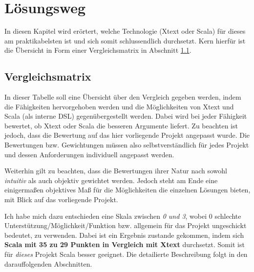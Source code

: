 \chapter{Lösungsweg}

In diesen Kapitel wird erörtert, welche Technologie (Xtext oder Scala) für
dieses am praktikabelsten ist und sich somit schlussendlich durchsetzt.
Kern hierfür ist die Übersicht in Form einer Vergleichsmatrix in Abschnitt
\ref{sec-vergleichsmatrix}.

\section{Vergleichsmatrix}\label{sec-vergleichsmatrix}

In dieser Tabelle soll eine Übersicht über den Vergleich gegeben werden, indem
die Fähigkeiten hervorgehoben werden und die Möglichkeiten von Xtext und
Scala (als interne DSL) gegenübergestellt werden. Dabei wird bei jeder
Fähigkeit bewertet, ob Xtext oder Scala die besseren Argumente liefert.
Zu beachten ist jedoch, dass die Bewertung auf das hier vorliegende Projekt
angepasst wurde. Die Bewertungen bzw. Gewichtungen müssen also
selbstverständlich für jedes Projekt und dessen Anforderungen individuell
angepasst werden.

Weiterhin gilt zu beachten, dass die Bewertungen ihrer Natur nach sowohl
\emph{intuitiv} als auch objektiv gewichtet werden. Jedoch steht am Ende
eine einigermaßen objektives Maß für die Möglichkeiten die einzelnen Lösungen
bieten, mit Blick auf das vorliegende Projekt.

Ich habe mich dazu entschieden eine Skala zwischen \emph{0 und 3}, wobei
0 schlechte Unterstützung/Möglichkeit/Funktion bzw. allgemein für das Projekt
ungeschickt bedeutet, zu verwenden.
Dabei ist ein Ergebnis zustande gekommen, indem sich \textbf{Scala mit 35 zu
29 Punkten in Vergleich mit Xtext} durchsetzt.
Somit ist für \emph{dieses} Projekt Scala besser geeignet.
Die detailierte Beschreibung folgt in den darauffolgenden Abschnitten.

